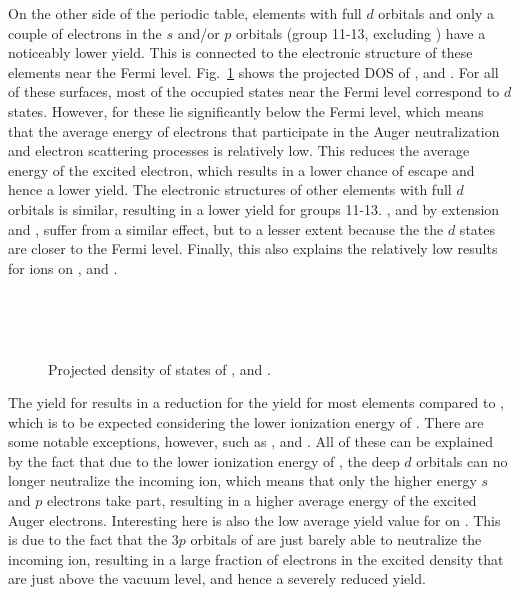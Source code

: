 \begin{refsection}
On the other side of the periodic table, elements with full $d$ orbitals and 
only a couple of electrons in the $s$ and/or $p$ orbitals (group 11-13, 
excluding ) have a noticeably lower yield. This is connected to the 
electronic structure of these elements near the Fermi level. Fig.~\ref{quotas:fig-pdos} 
shows the projected DOS of ,  and . 
For all of these surfaces, most of the occupied states near the Fermi level 
correspond to $d$ states. However, for  these 
lie significantly below the Fermi level, which means that the average energy of electrons that 
participate in the Auger neutralization and electron scattering processes is 
relatively low. This reduces the average energy of the excited electron, 
which results in a lower chance of escape and hence a lower yield. The electronic  structures of 
other elements with full $d$ orbitals is similar, resulting in a lower yield 
for groups 11-13. , and by extension  and , suffer from a
similar effect, but to a lesser extent because the 
the $d$ states are closer to the Fermi level. Finally, this also explains the relatively low results for  ions on ,  and . 

{
\begin{figure}[ht] 
    \centering
    \captionsetup{width=0.9\textwidth}
    \begin{subfigure}[t]{0.33\textwidth} 
        \centering 
        
    \end{subfigure}%
    ~  
    \begin{subfigure}[t]{0.29\textwidth} 
        \centering 
        
    \end{subfigure} 
    ~
    \begin{subfigure}[t]{0.29\textwidth}
        \centering 
          
    \end{subfigure}
    \caption{\label{quotas:fig-pdos}Projected density of states of ,  and .} 
\end{figure}
}
 
The yield for  results in a reduction for the yield for most elements 
compared to , which is to be expected considering the lower ionization 
energy of . There are some notable exceptions, however, such as ,  
and . All of these can be explained by the fact that due to the lower 
ionization energy of , the deep $d$ orbitals can no longer neutralize 
the incoming ion, which means that only the higher energy $s$ and $p$ electrons take 
part, resulting in a higher average energy of the excited Auger electrons. 
Interesting here is also the low average yield value for  on . 
This is due to the fact that the $3p$ orbitals of  are just barely able 
to neutralize the incoming ion, resulting in a large fraction of electrons in 
the excited density that are just above the vacuum level, and hence a severely 
reduced yield. 


\end{refsection}
